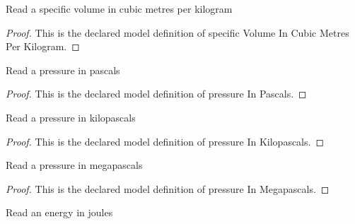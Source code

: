 \begin{definition}
  \label{def:physics:phyx-mini-0464:phyxminiproblems-problemphyxmini0464-specificvolumeincubicmetresperkilogram}
  Read a specific volume in cubic metres per kilogram
\end{definition}
\begin{proof}
  This is the declared model definition of specific Volume In Cubic Metres Per Kilogram.
\end{proof}
\begin{definition}
  \label{def:physics:phyx-mini-0464:phyxminiproblems-problemphyxmini0464-pressureinpascals}
  Read a pressure in pascals
\end{definition}
\begin{proof}
  This is the declared model definition of pressure In Pascals.
\end{proof}
\begin{definition}
  \label{def:physics:phyx-mini-0464:phyxminiproblems-problemphyxmini0464-pressureinkilopascals}
  Read a pressure in kilopascals
\end{definition}
\begin{proof}
  This is the declared model definition of pressure In Kilopascals.
\end{proof}
\begin{definition}
  \label{def:physics:phyx-mini-0464:phyxminiproblems-problemphyxmini0464-pressureinmegapascals}
  Read a pressure in megapascals
\end{definition}
\begin{proof}
  This is the declared model definition of pressure In Megapascals.
\end{proof}
\begin{definition}
  \label{def:physics:phyx-mini-0464:phyxminiproblems-problemphyxmini0464-energyinjoules}
  Read an energy in joules
\end{definition}
